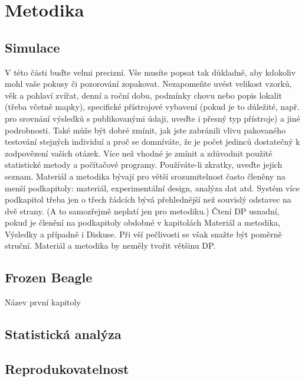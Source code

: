 \chapter{Metodika}

\section{Simulace}

V této části buďte velmi precizní. Vše musíte popsat tak důkladně, aby kdokoliv mohl vaše pokusy či pozorování zopakovat. Nezapomeňte uvést velikost vzorků, věk a pohlaví zvířat, denní a roční dobu, podmínky chovu nebo popis lokalit (třeba včetně mapky), specifické přístrojové vybavení (pokud je to důležité, např. pro srovnání výsledků s publikovanými údaji, uveďte i přesný typ přístroje) a jiné podrobnosti. Také může být dobré zmínit, jak jste zabránili vlivu pakovaného testování stejných
individuí a proč se domníváte, že je počet jedinců dostatečný k zodpovězení vašich otázek. Více než vhodné je zmínit a zdůvodnit použité statistické metody a počítačové programy. Používáte-li zkratky, uveďte jejich seznam.
Materiál a metodika bývají pro větší srozumitelnost často členěny na menší podkapitoly: materiál, experimentální design, analýza dat atd. Systém více podkapitol třeba jen o třech řádcích bývá přehlednější než souvislý odstavec na dvě strany. (A to samozřejmě neplatí jen pro metodiku.) Čtení DP usnadní, pokud je členění na podkapitoly obdobné v kapitolách Materiál a metodika, Výsledky a případně i Diskuse.
Při vší pečlivosti se však snažte být poměrně struční. Materiál a metodika by neměly tvořit většinu DP.

\section{Frozen Beagle}
Název první kapitoly
\section{Statistická analýza}
\section{Reprodukovatelnost}
